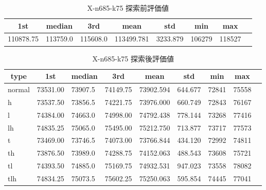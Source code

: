 \begin{table}[htbp]
    \caption{X-n685-k75 探索前評価値}
    \begin{tabular}{|l|l|l|l|l|l|l|l|}\hline
    \multicolumn{1}{|c|}{\textbf{1st}}
    &\multicolumn{1}{c|}{\textbf{median}}
    &\multicolumn{1}{c|}{\textbf{3rd}}
    &\multicolumn{1}{c|}{\textbf{mean}}
    &\multicolumn{1}{c|}{\textbf{std}}
    &\multicolumn{1}{c|}{\textbf{min}}
    &\multicolumn{1}{c|}{\textbf{max}}\\\hline
	110878.75 & 113759.0 & 115608.0 & 113499.781 & 3233.879 & 106279 & 118527\\\hline
	\end{tabular}
\end{table}
\begin{table}[htbp]
    \caption{X-n685-k75 探索後評価値}
    \begin{tabular}{|l|l|l|l|l|l|l|l|l|}\hline
    \multicolumn{1}{|c|}{\textbf{type}}
    &\multicolumn{1}{|c|}{\textbf{1st}}
    &\multicolumn{1}{c|}{\textbf{median}}
    &\multicolumn{1}{c|}{\textbf{3rd}}
    &\multicolumn{1}{c|}{\textbf{mean}}
    &\multicolumn{1}{c|}{\textbf{std}}
    &\multicolumn{1}{c|}{\textbf{min}}
    &\multicolumn{1}{c|}{\textbf{max}}\\\hline
	normal & 73531.00 & 73907.5 & 74149.75 & 73902.594 & 644.677 & 72841 & 75558\\\hline
	h & 73537.50 & 73856.5 & 74221.75 & 73976.000 & 660.749 & 72843 & 76167\\\hline
	l & 74384.00 & 74663.0 & 74998.00 & 74792.438 & 778.144 & 73268 & 77416\\\hline
	lh & 74835.25 & 75065.0 & 75495.00 & 75212.750 & 713.877 & 73717 & 77573\\\hline
	t & 73469.00 & 73746.5 & 74073.00 & 73766.844 & 434.120 & 72992 & 74811\\\hline
	th & 73876.50 & 73989.0 & 74288.75 & 74152.063 & 488.543 & 73608 & 75721\\\hline
	tl & 74393.50 & 74885.0 & 75169.75 & 74932.531 & 947.023 & 73558 & 78082\\\hline
	tlh & 74834.25 & 75073.5 & 75602.25 & 75250.063 & 595.854 & 74445 & 77041\\\hline
	\end{tabular}
\end{table}
